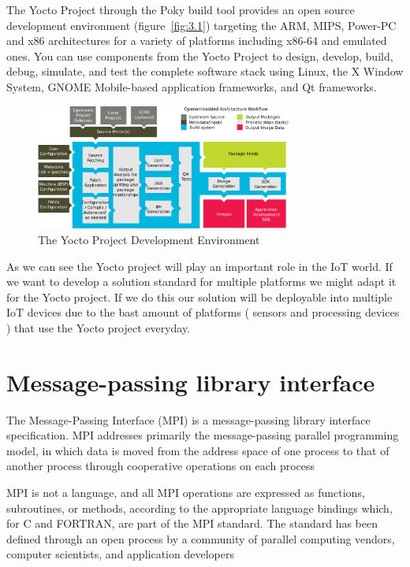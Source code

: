 The Yocto Project through the Poky build tool provides an open source
development environment (figure~\ref{fig:3.1})  targeting the ARM, MIPS,
Power-PC and x86 architectures for a variety of platforms including x86-64 and
emulated ones.  You can use components from the Yocto Project to design,
develop, build, debug, simulate, and test the complete software stack using
Linux, the X Window System, GNOME Mobile-based application frameworks, and Qt
frameworks. 

\begin{figure}[H]
\centering
\includegraphics[width=0.75\textwidth]{images/yocto-environment.png}
\caption{The Yocto Project Development Environment}
\label{fig:3.2}
\end{figure}

As we can see the Yocto project will play an important role in the IoT world.
If we want to develop a solution standard for multiple platforms we might adapt
it for the Yocto project. If we do this our solution will be deployable into
multiple IoT devices due to the bast amount of platforms ( sensors and
processing devices ) that use the Yocto project everyday.

\section{Message-passing library interface}
\noindent

The Message-Passing Interface (MPI) is a message-passing library interface
specification. MPI addresses primarily the message-passing parallel programming
model, in which data is moved from the address space of one process to that of
another process through cooperative operations on each process

MPI is not a language, and all MPI operations are expressed as functions,
subroutines, or methods, according to the appropriate language bindings which,
for C and FORTRAN, are part of the MPI standard. The standard has been defined
through an open process by a community of parallel computing vendors, computer
scientists, and application developers

